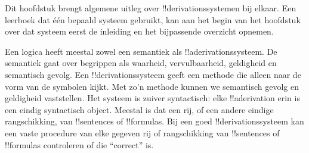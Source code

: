 \documentclass[openany]{memoir}
\begin{document}
\begingroup
\def\olfilename{OLP-0063}
\def\olfilepath{content/first-order-logic/proof-systems/}
\hypertarget{unit-OLP-0063}{}



      {}
      {}

\begin{editorial}
Dit hoofdstuk brengt algemene uitleg over !!{derivation}ssystemen bij
elkaar. Een leerboek dat één bepaald systeem gebruikt, kan aan het begin
van het hoofdstuk over dat systeem eerst de inleiding en het bijpassende
overzicht opnemen.
\end{editorial}
\endgroup

\begingroup
\def\olfilename{OLP-0064}
\def\olfilepath{content/first-order-logic/proof-systems/}
\hypertarget{unit-OLP-0064}{}



      {}
      {}


Een logica heeft meestal zowel een semantiek als
!!a{derivation}ssysteem. De semantiek gaat over begrippen als waarheid,
vervulbaarheid, geldigheid en semantisch gevolg. Een
!!{derivation}ssysteem geeft een methode die alleen naar de vorm van de
symbolen kijkt. Met zo'n methode kunnen we semantisch gevolg en
geldigheid vaststellen. Het systeem is zuiver syntactisch: elke
!!a{derivation} erin is een eindig syntactisch object. Meestal is dat
een rij, of een andere eindige rangschikking, van !!{sentence}s of
!!{formula}s. Bij een goed !!{derivation}ssysteem kan een vaste
procedure van elke gegeven rij of rangschikking van !!{sentence}s of
!!{formula}s controleren of die ``correct'' is.
\end{document}
